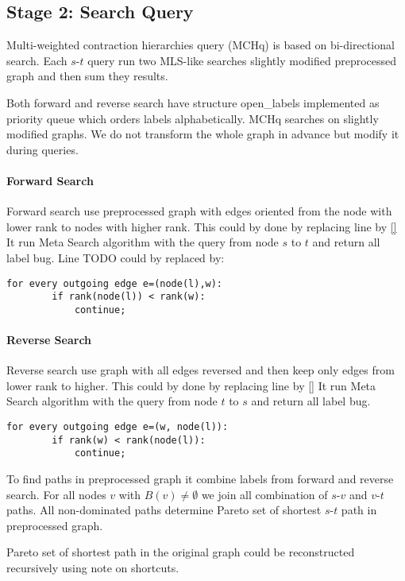 
\subsection{Stage 2: Search Query}
\label{subsecStage2}

Multi-weighted contraction hierarchies query (MCHq) is based on bi-directional search.
Each $s$-$t$ query run two MLS-like searches slightly modified preprocessed graph
and then sum they results.

Both forward and reverse search have
structure open\_labels implemented as priority queue which orders labels
alphabetically.
MCHq searches on slightly modified graphs. 
We do not transform the whole graph in advance but modify it during queries.

\paragraph*{Forward Search}
Forward search use preprocessed graph with edges oriented from the node with lower rank to nodes with higher rank.
This could by done by replacing line  by \ref{}
It run Meta Search algorithm with the query from node $s$ to $t$ and return all label bug.
Line TODO could by replaced by:

\begin{lstlisting}[caption={Forward Search},label=list:8-6,captionpos=t,float,abovecaptionskip=-\medskipamount]
    for every outgoing edge e=(node(l),w):
    	if rank(node(l)) < rank(w):
        	continue;
\end{lstlisting}

\paragraph*{Reverse Search}
Reverse search use graph with all edges reversed and then keep only edges
from lower rank to higher. 
This could by done by replacing line  by \ref{}
It run Meta Search algorithm with the query from node $t$ to $s$ and return all label bug.

\begin{lstlisting}[caption={Reverse Search},label=list:8-6,captionpos=t,float,abovecaptionskip=-\medskipamount]
    for every outgoing edge e=(w, node(l)):
    	if rank(w) < rank(node(l)):
        	continue;
\end{lstlisting}

To find paths in preprocessed graph it combine labels from forward and reverse search. 
For all nodes $v$ with $B(v) \ne \emptyset$ we join all combination of $s$-$v$ and $v$-$t$ paths. 
All non-dominated paths determine Pareto set of shortest $s$-$t$ path in preprocessed graph.

Pareto set of shortest path in the original graph could be reconstructed recursively
using note on shortcuts.

